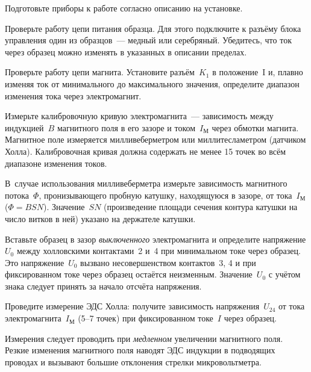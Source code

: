 \begin{lab:task}



\item Подготовьте приборы к работе согласно описанию на установке.

\item Проверьте работу цепи питания образца. Для этого подключите к разъёму
блока управления один из образцов~--- медный или серебряный. Убедитесь, что ток
через образец можно изменять в указанных в описании пределах.

\item Проверьте работу цепи магнита. Установите разъём~$K_1$ в положение~I и,
плавно изменяя ток от минимального до максимального значения, 
определите диапазон изменения тока через электромагнит.

\item Измерьте калибровочную кривую электромагнита~---
зависимость между индукцией~$B$ магнитного поля в его зазоре и 
током~$I_{М}$ через обмотки магнита.
Магнитное поле измеряется милливеберметром или миллитесламетром
(датчиком Холла). Калибровочная кривая должна содержать не менее
15 точек во всём диапазоне изменения токов.

В~случае использования милливеберметра измерьте зависимость 
магнитного потока~$\Phi$, пронизывающего пробную катушку, 
находящуюся в зазоре, от тока~$I_{М}$ ($\Phi=BSN$). 
Значение~$SN$ (произведение площади сечения контура катушки на
число витков в ней) указано на держателе катушки.

\item \label{p1} Вставьте образец в зазор \emph{выключенного} электромагнита 
и определите напряжение $U_0$ между холловскими
контактами~2 и~4 при минимальном токе через образец. 
Это напряжение~$U_0$ вызвано несовершенством контактов~3, 4 и при 
фиксированном токе через образец остаётся неизменным. Значение~$U_0$ с учётом 
знака следует принять за начало отсчёта напряжения.

\item \label{p2} Проведите измерение ЭДС Холла: получите зависимость 
напряжения~$U_{24}$ от тока электромагнита~$I_{М}$ (5--7 точек) 
при фиксированном токе~$I$ через образец.

Измерения следует проводить при \emph{медленном} увеличении магнитного поля. 
Резкие изменения магнитного поля наводят ЭДС индукции в подводящих проводах 
и вызывают большие отклонения стрелки микровольтметра.


\end{lab:task}
